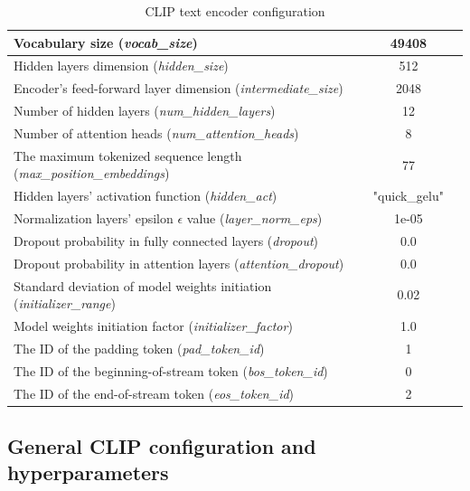 \documentclass[runningheads]{llncs}
\begin{document}
\begin{table}[H]\footnotesize
  \centering
  \caption{CLIP text encoder configuration}
  {\begin{tabular}{|l|c|c|} 
        \hline
        Vocabulary size (\textit{vocab\_size}) & 49408 \\
        \hline
        Hidden layers dimension (\textit{hidden\_size}) & 512 \\
        \hline
        Encoder's feed-forward layer dimension (\textit{intermediate\_size}) & 2048 \\
        \hline
        Number of hidden layers (\textit{num\_hidden\_layers}) & 12 \\
        \hline
        Number of attention heads (\textit{num\_attention\_heads}) & 8 \\
        \hline
        The maximum tokenized sequence length (\textit{max\_position\_embeddings}) & 77 \\
        \hline
        Hidden layers' activation function (\textit{hidden\_act}) & "quick\_gelu" \\
        \hline
        Normalization layers' epsilon $\epsilon$ value (\textit{layer\_norm\_eps}) & 1e-05 \\
        \hline
        Dropout probability in fully connected layers (\textit{dropout}) & 0.0 \\
        \hline
        Dropout probability in attention layers (\textit{attention\_dropout}) & 0.0 \\
        \hline
        Standard deviation of model weights initiation (\textit{initializer\_range}) & 0.02 \\
        \hline
        Model weights initiation factor (\textit{initializer\_factor}) & 1.0 \\
        \hline
        The ID of the padding token (\textit{pad\_token\_id}) & 1 \\
        \hline
        The ID of the beginning-of-stream token (\textit{bos\_token\_id}) & 0 \\
        \hline
        The ID of the end-of-stream token (\textit{eos\_token\_id}) & 2 \\
        \hline
  \end{tabular}}
  \label{tab:CLIP text model config}
\end{table}

\subsection{General CLIP configuration and hyperparameters}
\end{document}
